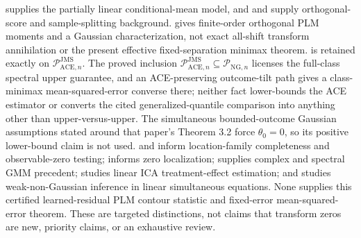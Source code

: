 \cite{Robinson1988} supplies the partially linear conditional-mean model, and \cite{ChernozhukovEtAl2018DML} and \cite{NeweyRobins2018} supply orthogonal-score and sample-splitting background.  \cite{MackeySyrgkanisZadik2018} gives finite-order orthogonal PLM moments and a Gaussian characterization, not exact all-shift transform annihilation or the present effective fixed-separation minimax theorem.  \cite[Theorem 5.4, condition (21), and bound (22)]{JinMackeySyrgkanis2025} is retained exactly on \(\mathcal P_{\mathrm{ACE},n}^{\mathrm{JMS}}\).  The proved inclusion \(\mathcal P_{\mathrm{ACE},n}^{\mathrm{JMS}}\subseteq\mathcal P_{\mathrm{NG},n}\) licenses the full-class spectral upper guarantee, and an ACE-preserving outcome-tilt path gives a class-minimax mean-squared-error converse there; neither fact lower-bounds the ACE estimator or converts the cited generalized-quantile comparison into anything other than upper-versus-upper.  The simultaneous bounded-outcome Gaussian assumptions stated around that paper's Theorem 3.2 force \(\theta_0=0\), so its positive lower-bound claim is not used.  \cite{Mattner1992} and \cite{HuShiu2022} inform location-family completeness and observable-zero testing; \cite{DinhGhoshTranTran2021} informs zero localization; \cite{ChackoViceira2003} supplies complex and spectral GMM precedent; \cite{ReizingerEtAl2025} studies linear ICA treatment-effect estimation; and \cite{LeeMesters2024} studies weak-non-Gaussian inference in linear simultaneous equations.  None supplies this certified learned-residual PLM contour statistic and fixed-error mean-squared-error theorem.  These are targeted distinctions, not claims that transform zeros are new, priority claims, or an exhaustive review.